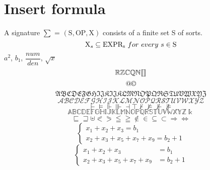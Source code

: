 \documentclass[]{article}
\begin{document}
\section{Insert formula}
A signature $\sum {\text{ = }}({\text{S}},{\text{OP}},{\text{X}})$ consists of a finite set S of sorts.
\begin{equation}
{{\text{X}}_s} \subseteq {\rm E}{\text{X}}{\rm P}{{\text{R}}_{\text{s}}}{\text{  }}for{\text{ }}every{\text{ }}s \in {\text{S}}
\end{equation}
$a^2$, $b_1$, $\dfrac{num}{den}$, $\sqrt{x}$
\[\mathbb{R}\mathbb{Z}\mathbb{C}\mathbb{Q}\mathbb{N} [\kern-0.15em[  ]\kern-0.15em] \]
\[@\copyright\]
\[\mathfrak{A}\mathfrak{B}\mathfrak{C}\mathfrak{D}\mathfrak{E}\mathfrak{F}\mathfrak{G}\mathfrak{H}\Im \mathfrak{J}\mathfrak{K}\Im \mathfrak{J}\mathfrak{K}\mathfrak{L}\mathfrak{M}\mathfrak{N}\mathfrak{O}\mathfrak{P}\mathfrak{Q}\Re \mathfrak{S}\mathfrak{T}\mathfrak{U}\mathfrak{V}\mathfrak{W}\mathfrak{X}\mathfrak{Y}\mathfrak{Z}\]
\[\mathcal{A}\mathcal{B}\mathcal{C}\mathcal{D}\mathcal{E}\mathcal{F}\mathcal{G}\mathcal{H}\mathcal{I}\mathcal{J}\mathcal{K}\mathcal{L}\mathcal{M}\mathcal{N}\mathcal{O}\mathcal{P}\mathcal{Q}\mathcal{R}\mathcal{S}\mathcal{T}\mathcal{U}\mathcal{V}\mathcal{W}\mathcal{X}\mathcal{Y}\mathcal{Z}\]
\[ \vdash  \vDash  \Vdash  \Vvdash  \dashv  \top  \nvdash  \nvDash  \nVdash  \nVDash \]
\[\mathbb{A}\mathbb{B}\mathbb{C}\mathbb{D}\mathbb{E}\mathbb{F}\mathbb{G}\mathbb{H}\mathbb{I}\mathbb{J}\mathbb{K}\mathbb{L}\mathbb{M}\mathbb{N}\mathbb{O}\mathbb{P}\mathbb{Q}\mathbb{R}\mathbb{S}\mathbb{T}\mathbb{U}\mathbb{V}\mathbb{W}\mathbb{X}\mathbb{Y}\mathbb{Z}\Bbbk \]
\[ \sqsubseteq  \sqsupseteq  \uplus  \eqslantless  \eqslantgtr  \leqq  \geqq  \notin  \in  \subseteq  \subset  \Rightarrow  \Leftrightarrow \]
\[\left\{ {\begin{array}{*{20}{c}}
	{{x_1} + {x_2} + {x_3}} = {{b_1}} \\ 
	{{x_2} + {x_3} + {x_5} + {x_7} + {x_9}} = {{b_2} + 1} 
	\end{array} } \right.\]
\[\left\{ {\begin{split}
	{{x_1} + {x_2} + {x_3}} & = {{b_1}} \\ 
	{{x_2} + {x_3} + {x_5} + {x_7} + {x_9}} & = {{b_2} + 1} 
	\end{split} } \right.\]
\end{document}
